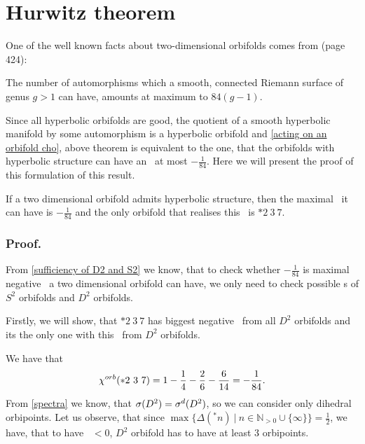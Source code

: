 \section{Hurwitz theorem}\label{największy orbifold}
One of the well known facts about two-dimensional orbifolds comes from \cite{Hurwitz1893} 
(page 424):
\begin{theorem}
The number of automorphisms which a smooth, connected Riemann surface of genus $g>1$ can have,  
amounts at maximum to $84(g-1)$. 
\end{theorem}
Since all hyperbolic orbifolds are good, the quotient of a 
smooth hyperbolic manifold by some automorphism is a hyperbolic orbifold and 
\ref{acting on an orbifold cho}, above theorem  
is equivalent to the one, that the orbifolds 
with hyperbolic structure can have an \Eoc\ at most $-\frac{1}{84}$. 
Here we will present the proof of this formulation of this result. 
\begin{theorem}
If a two dimensional orbifold admits hyperbolic structure, then the maximal \Eoc\ it can 
have is $-\frac{1}{84}$ and the only orbifold that realises this \Eoc\ is $*2\ 3\ 7$.
\end{theorem}
\subsubsection{Proof.}
From \ref{sufficiency of D2 and S2} we know, that to check whether $-\frac{1}{84}$ is maximal 
negative \Eoc\ a two dimensional orbifold can have, we only need to check possible 
\Eoc s of $S^2$ orbifolds and $D^2$ orbifolds. 

Firstly, we will show, that $*2\ 3\ 7$ has biggest negative \Eoc\ from all $D^2$ orbifolds 
and its the only one with this \Eoc\ from $D^2$ orbifolds.

We have that 
\begin{equation}
{\chi^{orb}(*2\ 3\ 7)} = 1 - \frac{1}{4} - \frac{2}{6} - \frac{6}{14} = -\frac{1}{84}. 
\end{equation}
From \ref{spectra} we know, that ${{\sigma}(D^2)} = {\sigma}^d(D^2)$, so we can consider only dihedral 
orbipoints. 
Let us observe, that since 
$\max\{\Delta(^*n)\ |\ n \in \mathbb{N}_{>0} \cup \{\infty\}\} = \frac{1}{2}$, we have, that 
to have \Eoc\ $<0$, 
$D^2$ orbifold has to have at least $3$ orbipoints.
 
